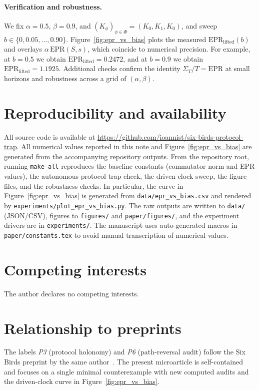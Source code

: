 \documentclass[11pt]{article}
\newcommand{\AlphaDefault}{0.5}
\newcommand{\BetaDefault}{0.9}
\newcommand{\EprLiftedBHalfShort}{0.2472}
\newcommand{\EprLiftedBPointNineShort}{1.1925}
\begin{document}
\paragraph{Verification and robustness.}
We fix \(\alpha=\AlphaDefault\), \(\beta=\BetaDefault\), and \((K_\phi)_{\phi\in\Phi}=(K_0,K_1,K_0)\), and sweep \(b\in\{0,0.05,\dots,0.90\}\).
Figure~\ref{fig:epr_vs_bias} plots the measured \(\mathrm{EPR}_{\mathrm{lifted}}(b)\) and overlays \(\alpha\,\mathrm{EPR}(S,s)\), which coincide to numerical precision.
For example, at \(b=0.5\) we obtain \(\mathrm{EPR}_{\mathrm{lifted}}=\EprLiftedBHalfShort\), and at \(b=0.9\) we obtain \(\mathrm{EPR}_{\mathrm{lifted}}=\EprLiftedBPointNineShort\).
Additional checks confirm the identity \(\Sigma_T/T=\mathrm{EPR}\) at small horizons and robustness across a grid of \((\alpha,\beta)\).
 \section*{Reproducibility and availability}

All source code is available at \url{https://github.com/ioannist/six-birds-protocol-trap}. All numerical values reported in this note and Figure~\ref{fig:epr_vs_bias} are generated from the accompanying repository outputs. From the repository root, running \texttt{make all} reproduces the baseline constants (commutator norm and EPR values), the autonomous protocol-trap check, the driven-clock sweep, the figure files, and the robustness checks. In particular, the curve in Figure~\ref{fig:epr_vs_bias} is generated from \texttt{data/epr\_vs\_bias.csv} and rendered by \texttt{experiments/plot\_epr\_vs\_bias.py}. The raw outputs are written to \texttt{data/} (JSON/CSV), figures to \texttt{figures/} and \texttt{paper/figures/}, and the experiment drivers are in \texttt{experiments/}. The manuscript uses auto-generated macros in \texttt{paper/constants.tex} to avoid manual transcription of numerical values.

\section*{Competing interests}
The author declares no competing interests.

\section*{Relationship to preprints}
The labels \emph{P3} (protocol holonomy) and \emph{P6} (path-reversal audit) follow the Six Birds preprint by the same author~\cite{tsiokos2026sixbirds}. The present microarticle is self-contained and focuses on a single minimal counterexample with new computed audits and the driven-clock curve in Figure~\ref{fig:epr_vs_bias}.
 

\end{document}
